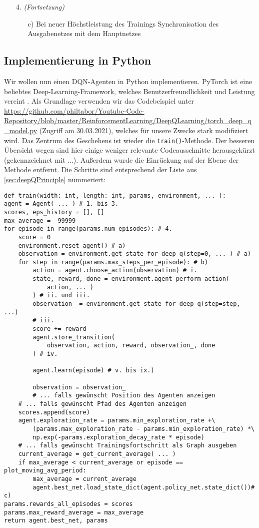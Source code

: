 \begin{enumerate}
    \item[4.] \textit{(Fortsetzung)} 
    \begin{enumerate}
        \item[c)] Bei neuer Höchstleistung des Trainings Synchronisation des Ausgabenetzes mit dem Hauptnetzes
    \end{enumerate}
\end{enumerate}

\subsection{Implementierung in Python}
Wir wollen nun einen DQN-Agenten in Python implementieren. PyTorch ist eine beliebtes Deep-Learning-Framework, welches Benutzerfreundlichkeit und Leistung vereint \cite{x01_pytorch}. Als Grundlage verwenden wir das Codebeispiel unter \url{https://github.com/philtabor/Youtube-Code-Repository/blob/master/ReinforcementLearning/DeepQLearning/torch_deep_q_model.py} (Zugriff am 30.03.2021), welches für unsere Zwecke stark modifiziert wird. Das Zentrum des Geschehens ist wieder die \texttt{train()}-Methode. Der besseren Übersicht wegen sind hier einige weniger relevante Codeausschnitte herausgekürzt (gekennzeichnet mit ...). Außerdem wurde die Einrückung auf der Ebene der Methode entfernt. Die Schritte sind entsprechend der Liste aus \ref{sec:deepQPrinciple} nummeriert:
\begin{verbatim}
def train(width: int, length: int, params, environment, ... ):
agent = Agent( ... ) # 1. bis 3.
scores, eps_history = [], []
max_average = -99999
for episode in range(params.num_episodes): # 4.
    score = 0
    environment.reset_agent() # a)
    observation = environment.get_state_for_deep_q(step=0, ... ) # a)
    for step in range(params.max_steps_per_episode): # b)
        action = agent.choose_action(observation) # i.
        state, reward, done = environment.agent_perform_action(
            action, ... )
        ) # ii. und iii.
        observation_ = environment.get_state_for_deep_q(step=step, ...)
        # iii.
        score += reward
        agent.store_transition(
            observation, action, reward, observation_, done
        ) # iv.

        agent.learn(episode) # v. bis ix.)

        observation = observation_
        # ... falls gewünscht Position des Agenten anzeigen
    # ... falls gewünscht Pfad des Agenten anzeigen
    scores.append(score)
    agent.exploration_rate = params.min_exploration_rate +\
        (params.max_exploration_rate - params.min_exploration_rate) *\
        np.exp(-params.exploration_decay_rate * episode)
    # ... falls gewünscht Trainingsfortschritt als Graph ausgeben
    current_average = get_current_average( ... )
    if max_average < current_average or episode == plot_moving_avg_period:
        max_average = current_average
        agent.best_net.load_state_dict(agent.policy_net.state_dict())# c)
params.rewards_all_episodes = scores
params.max_reward_average = max_average
return agent.best_net, params
\end{verbatim}

